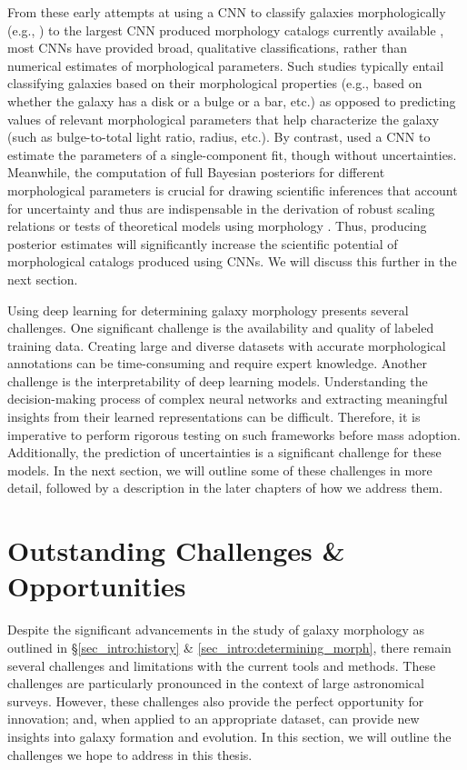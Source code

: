 From these early attempts at using a CNN to classify galaxies morphologically (e.g.,  \citealp{Dieleman2015Rotation-invariantPrediction}) to the largest CNN produced morphology catalogs currently available \citep{Cheng2021GalaxyNetworks, Vega-Ferrero2021PushingSurvey}, most CNNs have provided broad, qualitative classifications, rather than numerical estimates of morphological parameters. Such studies typically entail classifying galaxies based on their morphological properties (e.g., based on whether the galaxy has a disk or a bulge or a bar, etc.) as opposed to predicting values of relevant morphological parameters that help characterize the galaxy (such as bulge-to-total light ratio, radius, etc.). By contrast, \citet{Tuccillo2018DeepFitting} used a CNN to estimate the parameters of a single-component \sersic{} fit, though  without uncertainties. Meanwhile, the computation of full Bayesian posteriors for different morphological parameters is crucial for drawing scientific inferences that account for uncertainty and thus are indispensable in the derivation of robust scaling relations  \citep[e.g.,][]{Bernardi2013TheProfile, vanderWel20143D-HST+CANDELS:3} or tests of theoretical models using morphology \citep[e.g.,][]{Schawinski2014TheGalaxies}. Thus, producing posterior estimates will significantly increase the scientific potential of morphological catalogs produced using CNNs. We will discuss this further in the next section. 

Using deep learning for determining galaxy morphology presents several challenges. One significant challenge is the availability and quality of labeled training data. Creating large and diverse datasets with accurate morphological annotations can be time-consuming and require expert knowledge. Another challenge is the interpretability of deep learning models. Understanding the decision-making process of complex neural networks and extracting meaningful insights from their learned representations can be difficult. Therefore, it is imperative to perform rigorous testing on such frameworks before mass adoption. Additionally, the prediction of uncertainties is a significant challenge for these models. In the next section, we will outline some of these challenges in more detail, followed by a description in the later chapters of how we address them.

\section{Outstanding Challenges \& Opportunities} \label{sec_intro:outstanding_challenges}
Despite the significant advancements in the study of galaxy morphology as outlined in \S \ref{sec_intro:history} \& \ref{sec_intro:determining_morph}, there remain several challenges and limitations with the current tools and methods.
These challenges are particularly pronounced in the context of large astronomical surveys. However, these challenges also provide the perfect opportunity for innovation; and, when applied to an appropriate dataset, can provide new insights into galaxy formation and evolution. In this section, we will outline the challenges we hope to address in this thesis. 

